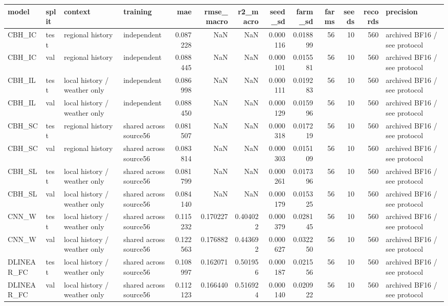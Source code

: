 \begin{tabular}{llllrrrrrrrrl}
\toprule
model & split & context & training & mae & rmse\_macro & r2\_macro & seed\_sd & farm\_sd & farms & seeds & records & precision \\
\midrule
CBH\_IC & test & regional history & independent & 0.087228 & NaN & NaN & 0.000116 & 0.018899 & 56 & 10 & 560 & archived BF16 / see protocol \\
CBH\_IC & val & regional history & independent & 0.088445 & NaN & NaN & 0.000101 & 0.015581 & 56 & 10 & 560 & archived BF16 / see protocol \\
CBH\_IL & test & local history / weather only & independent & 0.086998 & NaN & NaN & 0.000111 & 0.019283 & 56 & 10 & 560 & archived BF16 / see protocol \\
CBH\_IL & val & local history / weather only & independent & 0.088450 & NaN & NaN & 0.000129 & 0.015996 & 56 & 10 & 560 & archived BF16 / see protocol \\
CBH\_SC & test & regional history & shared across source56 & 0.081507 & NaN & NaN & 0.000318 & 0.017219 & 56 & 10 & 560 & archived BF16 / see protocol \\
CBH\_SC & val & regional history & shared across source56 & 0.083814 & NaN & NaN & 0.000303 & 0.015109 & 56 & 10 & 560 & archived BF16 / see protocol \\
CBH\_SL & test & local history / weather only & shared across source56 & 0.081799 & NaN & NaN & 0.000261 & 0.017396 & 56 & 10 & 560 & archived BF16 / see protocol \\
CBH\_SL & val & local history / weather only & shared across source56 & 0.084140 & NaN & NaN & 0.000179 & 0.015325 & 56 & 10 & 560 & archived BF16 / see protocol \\
CNN\_W & test & local history / weather only & shared across source56 & 0.115232 & 0.170227 & 0.404022 & 0.000379 & 0.028145 & 56 & 10 & 560 & archived BF16 / see protocol \\
CNN\_W & val & local history / weather only & shared across source56 & 0.122563 & 0.176882 & 0.443692 & 0.000627 & 0.032250 & 56 & 10 & 560 & archived BF16 / see protocol \\
DLINEAR\_FC & test & local history / weather only & shared across source56 & 0.108997 & 0.162071 & 0.501956 & 0.000187 & 0.021556 & 56 & 10 & 560 & archived BF16 / see protocol \\
DLINEAR\_FC & val & local history / weather only & shared across source56 & 0.112123 & 0.166440 & 0.516924 & 0.000140 & 0.020922 & 56 & 10 & 560 & archived BF16 / see protocol \\

\end{tabular}
